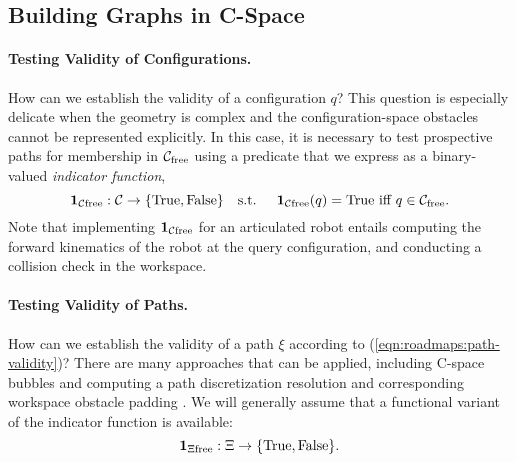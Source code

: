 \subsection{Building Graphs in C-Space}
\label{subsec:roadmaps:building-graphs}

\paragraph{Testing Validity of Configurations.}
How can we establish the validity of a configuration $q$?
This question is especially delicate when the geometry is complex
and the configuration-space obstacles cannot be represented explicitly.
In this case,
it is necessary to test prospective paths
for membership in $\mathcal{C}_{\mbox{\scriptsize free}}$ using a predicate
that we express as a binary-valued
\emph{indicator function},
\begin{equation}
   \mathbf{1}_{\mathcal{C}\mbox{\scriptsize free}} : \mathcal{C} \rightarrow
      \{ \mbox{True}, \mbox{False} \} 
   \mbox{\quad s.t. \quad}
   \mathbf{1}_{\mathcal{C}\mbox{\scriptsize free}}(q) = \mbox{True} \mbox{ iff } q \in \mathcal{C}_{\mbox{\scriptsize free}}.
\end{equation}
Note that implementing $\mathbf{1}_{\mathcal{C}\mbox{\scriptsize free}}$ for an articulated robot
entails computing the forward kinematics of the robot at the
query configuration,
and conducting a collision check in the workspace.

\paragraph{Testing Validity of Paths.}
How can we establish the validity of a path $\xi$
according to (\ref{eqn:roadmaps:path-validity})?
There are many approaches that can be applied,
including C-space bubbles \citep{quinlan1994modification}
and computing a path discretization resolution and corresponding
workspace obstacle padding
\citep{barraquand1991distributedrepresentation}.
We will generally assume that a functional variant of the indicator
function is available:%
%
\begin{equation}
   \mathbf{1}_{\Xi\mbox{\scriptsize free}} : \Xi \rightarrow
      \{ \mbox{True}, \mbox{False} \} .
\end{equation}

